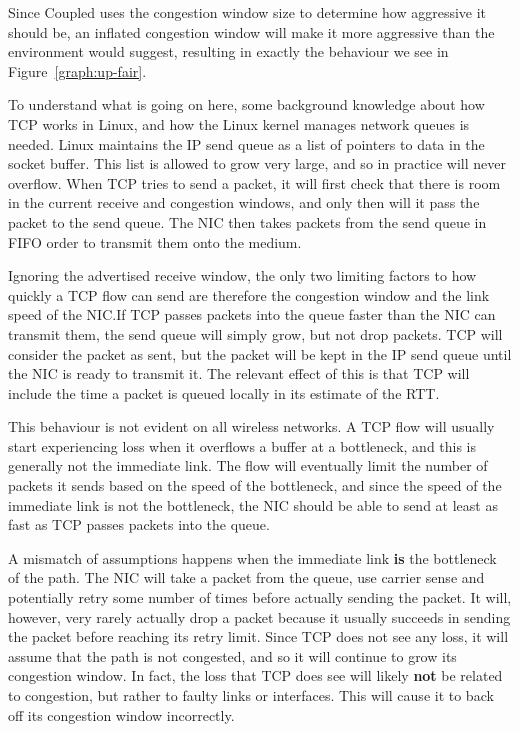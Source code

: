 Since Coupled uses the congestion window size to determine how aggressive it
should be, an inflated congestion window will make it more aggressive than the 
environment would suggest, resulting in exactly the behaviour we see in
Figure~\ref{graph:up-fair}.

To understand what is going on here, some background knowledge about how TCP
works in Linux, and how the Linux kernel manages network queues is needed. Linux
maintains the IP send queue as a list of pointers to data in the socket buffer. 
This list is allowed to grow very large, and so in practice will never overflow.
When TCP tries to send a packet, it will first check that there is room in
the current receive and congestion windows, and only then will it pass the packet to the
send queue. The NIC then takes packets  from the send queue in FIFO order to
transmit them onto the medium.

Ignoring the advertised receive window, the only two limiting factors to how
quickly a TCP flow
can send are therefore the congestion window and the link speed of the NIC.\@ If
TCP passes packets into the queue faster than the NIC can transmit them, the
send queue will simply grow, but not drop packets. TCP will consider the
packet as sent, but the packet will be kept in the IP send queue until
the NIC is ready to transmit it. The relevant effect of this is that TCP will
include the time a packet is queued locally in its estimate of the RTT.

This behaviour is not evident on all wireless networks. A TCP flow
will usually start experiencing loss when it overflows a
buffer at a bottleneck, and this is generally not the immediate link.
The flow will eventually limit the number of packets it sends based on the
speed of the bottleneck, and since the speed of the immediate link is not
the bottleneck, the NIC should be able to send at least as fast as TCP passes
packets into the queue.

A mismatch of assumptions happens when the immediate link \textbf{is} the 
bottleneck of the path. The NIC will take a packet from the queue, use carrier 
sense and potentially retry some number of times before actually sending the 
packet. It will, however, very rarely actually drop a packet because it usually 
succeeds in sending the packet before reaching its retry limit. Since TCP does 
not see any loss, it will assume that the path is not congested, and so it will 
continue to grow its congestion window.  In fact, the loss that TCP does see 
will likely \textbf{not} be related to congestion, but rather to faulty links or interfaces.
This will cause it to back off its congestion window incorrectly.

